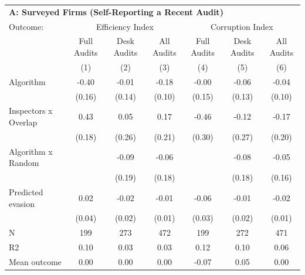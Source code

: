 \begin{tabular}{lccc|ccc} \toprule
\multicolumn{7}{l}{\textbf{A: Surveyed Firms (Self-Reporting a Recent Audit)}} \\ \multicolumn{1}{l}{Outcome:} & \multicolumn{3}{c}{Efficiency Index} & \multicolumn{3}{c}{Corruption Index} \\ \multicolumn{1}{l}{} & Full Audits & Desk Audits & All Audits & Full Audits & Desk Audits & All Audits \\ \multicolumn{1}{l}{} & (1) & (2) & (3) & (4) & (5) & (6) \\ \midrule
Algorithm   &       -0.40\sym{**} &       -0.01         &       -0.18\sym{*}  &       -0.00         &       -0.06         &       -0.04         \\
            &      (0.16)         &      (0.14)         &      (0.10)         &      (0.15)         &      (0.13)         &      (0.10)         \\
\addlinespace
Inspectors x Overlap&        0.43\sym{**} &        0.05         &        0.17         &       -0.46         &       -0.12         &       -0.17         \\
            &      (0.18)         &      (0.26)         &      (0.21)         &      (0.30)         &      (0.27)         &      (0.20)         \\
\addlinespace
Algorithm x Random&                     &       -0.09         &       -0.06         &                     &       -0.08         &       -0.05         \\
            &                     &      (0.19)         &      (0.18)         &                     &      (0.18)         &      (0.16)         \\
\addlinespace
Predicted evasion&        0.02         &       -0.02         &       -0.01         &       -0.06         &       -0.01         &       -0.02         \\
            &      (0.04)         &      (0.02)         &      (0.01)         &      (0.03)         &      (0.02)         &      (0.01)         \\
\midrule
N           &         199         &         273         &         472         &         199         &         272         &         471         \\
R2          &        0.10         &        0.03         &        0.03         &        0.12         &        0.10         &        0.06         \\
Mean outcome&        0.00         &        0.00         &        0.00         &       -0.07         &        0.05         &        0.00         \\


\end{tabular}
